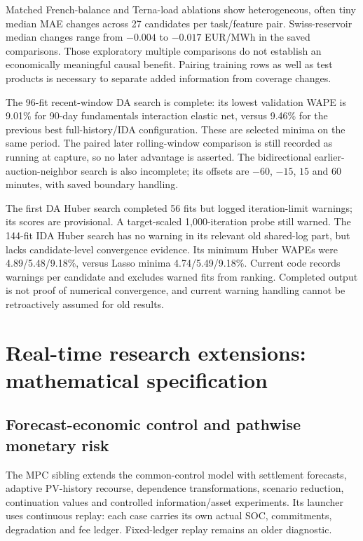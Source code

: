 Matched French-balance and Terna-load ablations show heterogeneous, often tiny
median MAE changes across 27 candidates per task/feature pair. Swiss-reservoir
median changes range from $-0.004$ to $-0.017$ EUR/MWh in the saved comparisons.
Those exploratory multiple comparisons do not establish an economically
meaningful causal benefit. Pairing training rows as well as test products is
necessary to separate added information from coverage changes.

The 96-fit recent-window DA search is complete: its lowest validation WAPE is
9.01\% for 90-day fundamentals interaction elastic net, versus 9.46\% for the
previous best full-history/IDA configuration. These are selected minima on the
same period. The paired later rolling-window comparison is still recorded as
running at capture, so no later advantage is asserted. The bidirectional
earlier-auction-neighbor search is also incomplete; its offsets are $-60$,
$-15$, $15$ and $60$ minutes, with saved boundary handling.

The first DA Huber search completed 56 fits but logged iteration-limit warnings;
its scores are provisional. A target-scaled 1,000-iteration probe still warned.
The 144-fit IDA Huber search has no warning in its relevant old shared-log part,
but lacks candidate-level convergence evidence. Its minimum Huber WAPEs were
4.89/5.48/9.18\%, versus Lasso minima 4.74/5.49/9.18\%. Current code records
warnings per candidate and excludes warned fits from ranking. Completed output
is not proof of numerical convergence, and current warning handling cannot be
retroactively assumed for old results.

\clearpage
\section{Real-time research extensions: mathematical specification}
\label{sec:research-extensions}

\subsection{Forecast-economic control and pathwise monetary risk}
The MPC sibling extends the common-control model with settlement forecasts,
adaptive PV-history recourse, dependence transformations, scenario reduction,
continuation values and controlled information/asset experiments. Its launcher
uses continuous replay: each case carries its own actual SOC, commitments,
degradation and fee ledger. Fixed-ledger replay remains an older diagnostic.

